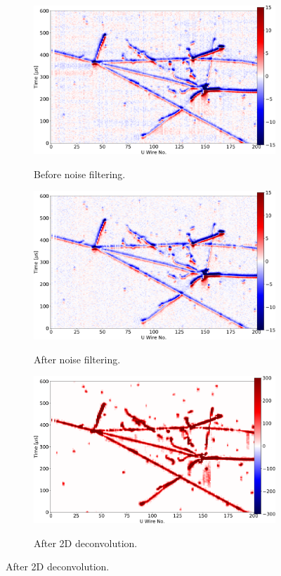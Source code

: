 \begin{figure}

	\centering

	\begin{subfigure}{0.49\textwidth}
		\includegraphics[width=\textwidth]{figures/protodune_evd_orig.pdf}
		\label{fig:pdsp_raw}
		\caption{Before noise filtering.}
	\end{subfigure}
	\hfill
	\begin{subfigure}{0.49\textwidth}
		\includegraphics[width=\textwidth]{figures/protodune_evd_raw.pdf}
		\label{fig:pdsp_filt}
		\caption{After noise filtering.}
	\end{subfigure}
	\begin{subfigure}{0.49\textwidth}
		\vspace{5mm}
		\includegraphics[width=\textwidth]{figures/protodune_evd_decon.pdf}
		\label{fig:pdsp_deconv}
		\caption{After 2D deconvolution.}
	\end{subfigure}


\end{figure}
